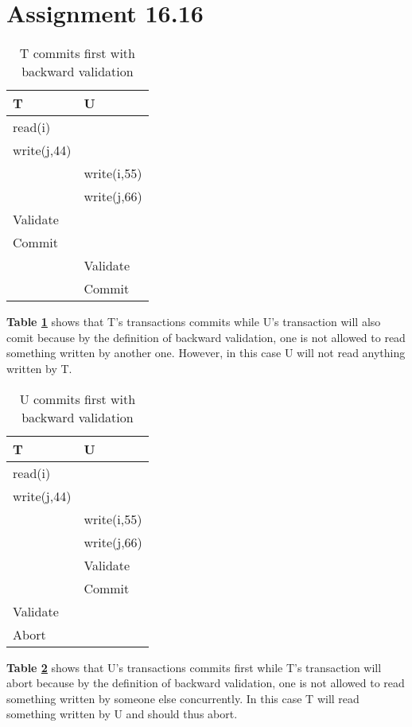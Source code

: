 \section{Assignment 16.16}

\begin{table}[H]
	\centering
	\caption{T commits first with backward validation}
	\label{TfirstBack}
	\begin{tabular}{|l|l|}
		\hline
		T           & U           \\ \hline
		read(i)     &             \\ \hline
		write(j,44) &             \\ \hline
		& write(i,55) \\ \hline
		& write(j,66) \\ \hline
		Validate    &             \\ \hline
		Commit      &             \\ \hline
		& Validate    \\ \hline
		& Commit       \\ \hline
	\end{tabular}
\end{table}
\textbf{Table \ref{TfirstBack}} shows that T's transactions commits while U's transaction will also comit because by the definition of backward validation, one is not allowed to read something written by another one. However, in this case U will not read anything written by T.

\begin{table}[H]
	\centering
	\caption{U commits first with backward validation}
	\label{UfirstBack}
	\begin{tabular}{|l|l|}
		\hline
		T           & U           \\ \hline
		read(i)     &             \\ \hline
		write(j,44) &             \\ \hline
					& write(i,55) \\ \hline
					& write(j,66) \\ \hline
				    & Validate   \\ \hline
				    & Commit      \\ \hline
		Validate	&    \\ \hline
		Abort		&     \\ \hline
	\end{tabular}
\end{table}
\textbf{Table \ref{UfirstBack}} shows that U's transactions commits first while T's transaction will abort because by the definition of backward validation, one is not allowed to read something written by someone else concurrently. In this case T will read something written by U and should thus abort.



